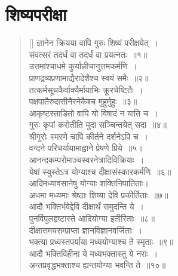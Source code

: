 \documentclass[twoside,12pt,notitlepage]{book}
\begin{document}
\section{शिष्यपरीक्षा}
\begin{verse}[\versewidth]
ज्ञानेन क्रियया वापि गुरुः शिष्यं परीक्षयेत्~।\\[-6pt]
संवत्सरं तदर्धं वा तदर्धं वा प्रयत्नतः~॥१॥\\
उत्तमांश्चाधमे कुर्यान्नीचानुत्तमकर्मणि~।\\[-6pt]
प्राणद्रव्यप्रणामाद्यैरादेशैश्च स्वयं समैः~॥२॥\footA \\
तत्कर्मसूचकैर्वाक्यैर्मायाभिः क्रूरचेष्टितैः~।\\[-6pt]
पक्षपातैरुदासीनैरनेकैश्च  मुहुर्मुहुः~॥३॥\footA \\
आकृष्टस्ताडितो वापि यो विषादं न याति च~।\\[-6pt]
गुरुः कृपां करोतीति मुदा सञ्चिन्तयेत् सदा~॥४॥\\
श्रीगुरोः स्मरणे चापि कीर्तने दर्शनेऽपि च~।\\[-6pt]
वन्दने परिचर्यायामाह्वाने प्रेषणे प्रिये~॥५॥\\
आनन्दकम्परोमाञ्चस्वरनेत्रादिविक्रियाः~।\\[-6pt]
येषां स्युस्तेऽत्र योग्याश्च दीक्षासंस्कारकर्मणि~॥६॥\\
आदिमध्यावसानेषु योग्याः शक्तिनिपातिताः।\\[-6pt]
अधमा मध्यमाः श्रेष्ठाः शिष्या देवि प्रकीर्तिताः~॥७॥\\
आदौ भक्तिर्भवेद्देवि दीक्षार्थं समुदन्ति ये~।\\[-6pt]
पुनर्विपुलहृष्टास्ते आदियोग्या इतीरिताः~॥८॥\\
दीक्षासमयसम्प्राप्ता ज्ञानविज्ञानवर्जिताः~।\\[-6pt]
भक्त्या प्रध्वस्तपर्याया मध्ययोग्याश्च ते स्मृताः~॥९॥\\
आदौ भक्तिविहीना ये मध्यभक्तास्तु ये नराः~।\\[-6pt]
अन्तप्रवृद्धभक्ताश्च ह्यन्तयोग्या भवन्ति ते~॥१०॥
\end{verse}
\end{document}
